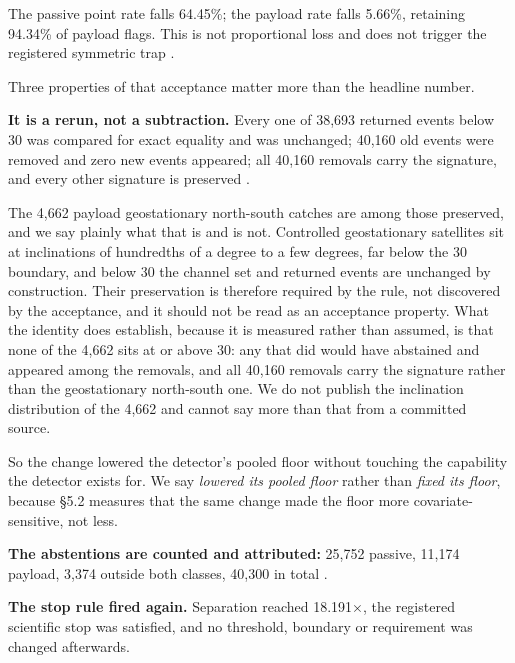 \documentclass[11pt]{article}
\begin{document}

The passive point rate falls 64.45\%; the payload rate falls 5.66\%, retaining 94.34\% of payload flags. This is not proportional loss and does not trigger the registered symmetric trap%
.

Three properties of that acceptance matter more than the headline number.

\textbf{It is a rerun, not a subtraction.} Every one of 38,693 returned events below 30\textdegree{} was compared for exact equality and was unchanged; 40,160 old events were removed and zero new events appeared; all 40,160 removals carry the  signature, and every other signature is preserved%
.

The 4,662 payload geostationary north-south catches are among those preserved, and we say plainly what that is and is not. Controlled geostationary satellites sit at inclinations of hundredths of a degree to a few degrees, far below the 30\textdegree{} boundary, and below 30\textdegree{} the channel set and returned events are unchanged by construction. Their preservation is therefore required by the rule, not discovered by the acceptance, and it should not be read as an acceptance property. What the identity does establish, because it is measured rather than assumed, is that none of the 4,662 sits at or above 30\textdegree{}: any that did would have abstained and appeared among the removals, and all 40,160 removals carry the  signature rather than the geostationary north-south one. We do not publish the inclination distribution of the 4,662 and cannot say more than that from a committed source.

So the change lowered the detector's pooled floor without touching the capability the detector exists for. We say \emph{lowered its pooled floor} rather than \emph{fixed its floor}, because \S{}5.2 measures that the same change made the floor more covariate-sensitive, not less.

\textbf{The abstentions are counted and attributed:} 25,752 passive, 11,174 payload, 3,374 outside both classes, 40,300 in total%
.

\textbf{The stop rule fired again.} Separation reached 18.191$\times$, the registered scientific stop was satisfied, and no threshold, boundary or requirement was changed afterwards.
\end{document}
